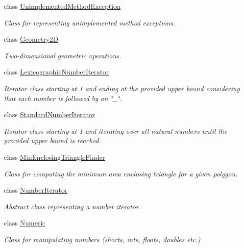 \begin{DoxyCompactItemize}
class \hyperlink{classmultiscale_1_1UnimplementedMethodException}{\-Unimplemented\-Method\-Exception}
\begin{DoxyCompactList}\small\item\em \-Class for representing unimplemented method exceptions. \end{DoxyCompactList}\item 
class \hyperlink{classmultiscale_1_1Geometry2D}{\-Geometry2\-D}
\begin{DoxyCompactList}\small\item\em \-Two-\/dimensional geometric operations. \end{DoxyCompactList}\item 
class \hyperlink{classmultiscale_1_1LexicographicNumberIterator}{\-Lexicographic\-Number\-Iterator}
\begin{DoxyCompactList}\small\item\em \-Iterator class starting at 1 and ending at the provided upper bound considering that each number is followed by an \char`\"{}\-\_\-\char`\"{}. \end{DoxyCompactList}\item 
class \hyperlink{classmultiscale_1_1StandardNumberIterator}{\-Standard\-Number\-Iterator}
\begin{DoxyCompactList}\small\item\em \-Iterator class starting at 1 and iterating over all natural numbers until the provided upper bound is reached. \end{DoxyCompactList}\item 
class \hyperlink{classmultiscale_1_1MinEnclosingTriangleFinder}{\-Min\-Enclosing\-Triangle\-Finder}
\begin{DoxyCompactList}\small\item\em \-Class for computing the minimum area enclosing triangle for a given polygon. \end{DoxyCompactList}\item 
class \hyperlink{classmultiscale_1_1NumberIterator}{\-Number\-Iterator}
\begin{DoxyCompactList}\small\item\em \-Abstract class representing a number iterator. \end{DoxyCompactList}\item 
class \hyperlink{classmultiscale_1_1Numeric}{\-Numeric}
\begin{DoxyCompactList}\small\item\em \-Class for manipulating numbers (shorts, ints, floats, doubles etc.) \end{DoxyCompactList}\item 

\end{DoxyCompactItemize}
